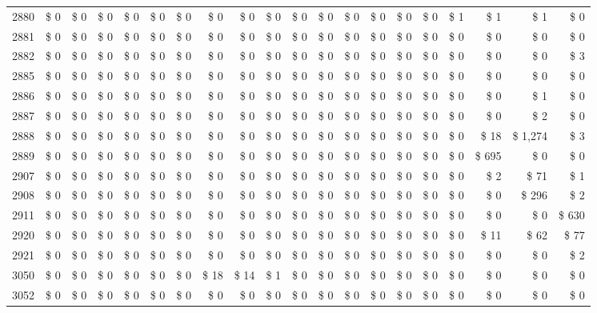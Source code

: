 \begin{longtable}{lrrrrrrrrrrrrrrrrrrr}
2880 & \$ 0 & \$ 0 & \$ 0 & \$ 0 & \$ 0 & \$ 0 & \$ 0 & \$ 0 & \$ 0 & \$ 0 & \$ 0 & \$ 0 & \$ 0 & \$ 0 & \$ 0 & \$ 1 & \$ 1 & \$ 1 & \$ 0 \\
2881 & \$ 0 & \$ 0 & \$ 0 & \$ 0 & \$ 0 & \$ 0 & \$ 0 & \$ 0 & \$ 0 & \$ 0 & \$ 0 & \$ 0 & \$ 0 & \$ 0 & \$ 0 & \$ 0 & \$ 0 & \$ 0 & \$ 0 \\
2882 & \$ 0 & \$ 0 & \$ 0 & \$ 0 & \$ 0 & \$ 0 & \$ 0 & \$ 0 & \$ 0 & \$ 0 & \$ 0 & \$ 0 & \$ 0 & \$ 0 & \$ 0 & \$ 0 & \$ 0 & \$ 0 & \$ 3 \\
2885 & \$ 0 & \$ 0 & \$ 0 & \$ 0 & \$ 0 & \$ 0 & \$ 0 & \$ 0 & \$ 0 & \$ 0 & \$ 0 & \$ 0 & \$ 0 & \$ 0 & \$ 0 & \$ 0 & \$ 0 & \$ 0 & \$ 0 \\
2886 & \$ 0 & \$ 0 & \$ 0 & \$ 0 & \$ 0 & \$ 0 & \$ 0 & \$ 0 & \$ 0 & \$ 0 & \$ 0 & \$ 0 & \$ 0 & \$ 0 & \$ 0 & \$ 0 & \$ 0 & \$ 1 & \$ 0 \\
2887 & \$ 0 & \$ 0 & \$ 0 & \$ 0 & \$ 0 & \$ 0 & \$ 0 & \$ 0 & \$ 0 & \$ 0 & \$ 0 & \$ 0 & \$ 0 & \$ 0 & \$ 0 & \$ 0 & \$ 0 & \$ 2 & \$ 0 \\
2888 & \$ 0 & \$ 0 & \$ 0 & \$ 0 & \$ 0 & \$ 0 & \$ 0 & \$ 0 & \$ 0 & \$ 0 & \$ 0 & \$ 0 & \$ 0 & \$ 0 & \$ 0 & \$ 0 & \$ 18 & \$ 1,274 & \$ 3 \\
2889 & \$ 0 & \$ 0 & \$ 0 & \$ 0 & \$ 0 & \$ 0 & \$ 0 & \$ 0 & \$ 0 & \$ 0 & \$ 0 & \$ 0 & \$ 0 & \$ 0 & \$ 0 & \$ 0 & \$ 695 & \$ 0 & \$ 0 \\
2907 & \$ 0 & \$ 0 & \$ 0 & \$ 0 & \$ 0 & \$ 0 & \$ 0 & \$ 0 & \$ 0 & \$ 0 & \$ 0 & \$ 0 & \$ 0 & \$ 0 & \$ 0 & \$ 0 & \$ 2 & \$ 71 & \$ 1 \\
2908 & \$ 0 & \$ 0 & \$ 0 & \$ 0 & \$ 0 & \$ 0 & \$ 0 & \$ 0 & \$ 0 & \$ 0 & \$ 0 & \$ 0 & \$ 0 & \$ 0 & \$ 0 & \$ 0 & \$ 0 & \$ 296 & \$ 2 \\
2911 & \$ 0 & \$ 0 & \$ 0 & \$ 0 & \$ 0 & \$ 0 & \$ 0 & \$ 0 & \$ 0 & \$ 0 & \$ 0 & \$ 0 & \$ 0 & \$ 0 & \$ 0 & \$ 0 & \$ 0 & \$ 0 & \$ 630 \\
2920 & \$ 0 & \$ 0 & \$ 0 & \$ 0 & \$ 0 & \$ 0 & \$ 0 & \$ 0 & \$ 0 & \$ 0 & \$ 0 & \$ 0 & \$ 0 & \$ 0 & \$ 0 & \$ 0 & \$ 11 & \$ 62 & \$ 77 \\
2921 & \$ 0 & \$ 0 & \$ 0 & \$ 0 & \$ 0 & \$ 0 & \$ 0 & \$ 0 & \$ 0 & \$ 0 & \$ 0 & \$ 0 & \$ 0 & \$ 0 & \$ 0 & \$ 0 & \$ 0 & \$ 0 & \$ 2 \\
3050 & \$ 0 & \$ 0 & \$ 0 & \$ 0 & \$ 0 & \$ 0 & \$ 18 & \$ 14 & \$ 1 & \$ 0 & \$ 0 & \$ 0 & \$ 0 & \$ 0 & \$ 0 & \$ 0 & \$ 0 & \$ 0 & \$ 0 \\
3052 & \$ 0 & \$ 0 & \$ 0 & \$ 0 & \$ 0 & \$ 0 & \$ 0 & \$ 0 & \$ 0 & \$ 0 & \$ 0 & \$ 0 & \$ 0 & \$ 0 & \$ 0 & \$ 0 & \$ 0 & \$ 0 & \$ 0 \\

\end{longtable}
